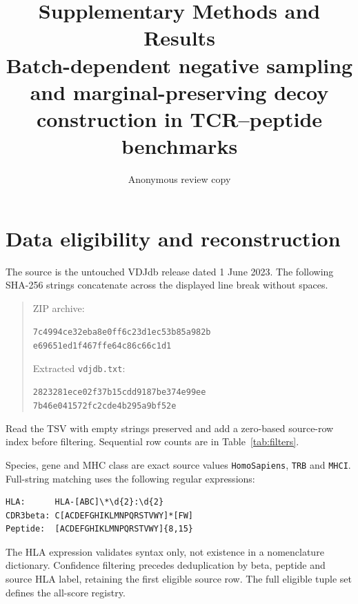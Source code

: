 \documentclass[11pt,a4paper]{article}
\title{Supplementary Methods and Results\\\large Batch-dependent negative sampling and marginal-preserving decoy construction in TCR--peptide benchmarks}
\author{Anonymous review copy}
\date{}
\begin{document}
\maketitle
\section{Data eligibility and reconstruction}
The source is the untouched VDJdb release dated 1 June 2023. The following SHA-256 strings concatenate across the displayed line break without spaces.
\begin{quote}\small
ZIP archive:\par\texttt{7c4994ce32eba8e0ff6c23d1ec53b85a982b}\\\texttt{e69651ed1f467ffe64c86c66c1d1}\par
Extracted \texttt{vdjdb.txt}:\par\texttt{2823281ece02f37b15cdd9187be374e99ee}\\\texttt{7b46e041572fc2cde4b295a9bf52e}
\end{quote}
Read the TSV with empty strings preserved and add a zero-based source-row index before filtering. Sequential row counts are in Table~\ref{tab:filters}.
\begin{table}[h]\centering
\caption{Deterministic filtering before confidence selection and tuple deduplication.}\label{tab:filters}

\end{table}
Species, gene and MHC class are exact source values \texttt{HomoSapiens}, \texttt{TRB} and \texttt{MHCI}. Full-string matching uses the following regular expressions:
\begin{verbatim}
HLA:      HLA-[ABC]\*\d{2}:\d{2}
CDR3beta: C[ACDEFGHIKLMNPQRSTVWY]*[FW]
Peptide:  [ACDEFGHIKLMNPQRSTVWY]{8,15}
\end{verbatim}
The HLA expression validates syntax only, not existence in a nomenclature dictionary. Confidence filtering precedes deduplication by beta, peptide and source HLA label, retaining the first eligible source row. The full eligible tuple set defines the all-score registry.
\end{document}

